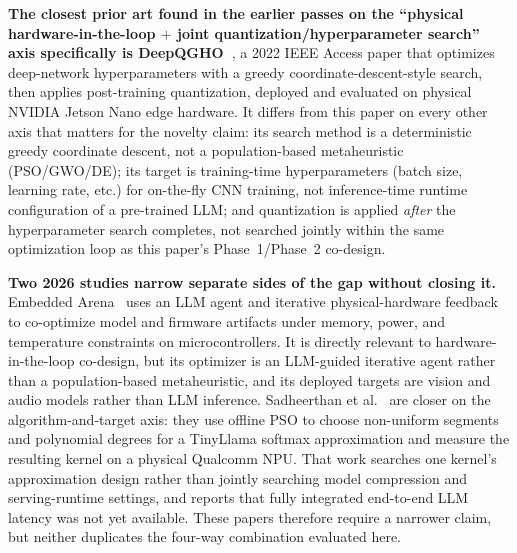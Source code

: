 \documentclass[journal]{IEEEtran}
\begin{document}
\textbf{The closest prior art found in the earlier passes on the ``physical hardware-in-the-loop $+$ joint quantization/hyperparameter search'' axis specifically is DeepQGHO~\cite{ref20}}, a 2022 IEEE Access paper that optimizes deep-network hyperparameters with a greedy coordinate-descent-style search, then applies post-training quantization, deployed and evaluated on physical NVIDIA Jetson Nano edge hardware. It differs from this paper on every other axis that matters for the novelty claim: its search method is a deterministic greedy coordinate descent, not a population-based metaheuristic (PSO/GWO/DE); its target is training-time hyperparameters (batch size, learning rate, etc.) for on-the-fly CNN training, not inference-time runtime configuration of a pre-trained LLM; and quantization is applied \emph{after} the hyperparameter search completes, not searched jointly within the same optimization loop as this paper's Phase~1/Phase~2 co-design.

\textbf{Two 2026 studies narrow separate sides of the gap without closing it.} Embedded Arena~\cite{ref21} uses an LLM agent and iterative physical-hardware feedback to co-optimize model and firmware artifacts under memory, power, and temperature constraints on microcontrollers. It is directly relevant to hardware-in-the-loop co-design, but its optimizer is an LLM-guided iterative agent rather than a population-based metaheuristic, and its deployed targets are vision and audio models rather than LLM inference. Sadheerthan et al.~\cite{ref22} are closer on the algorithm-and-target axis: they use offline PSO to choose non-uniform segments and polynomial degrees for a TinyLlama softmax approximation and measure the resulting kernel on a physical Qualcomm NPU. That work searches one kernel's approximation design rather than jointly searching model compression and serving-runtime settings, and reports that fully integrated end-to-end LLM latency was not yet available. These papers therefore require a narrower claim, but neither duplicates the four-way combination evaluated here.
\end{document}
